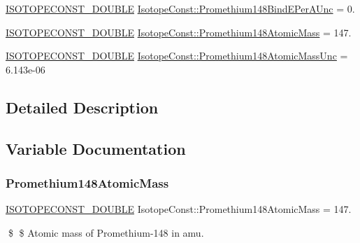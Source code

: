 \begin{DoxyCompactItemize}
\item 
\mbox{\hyperlink{group___isotope_const-_macros_ga8f45a7272ce02c0b4c65c44636ed719a}{I\+S\+O\+T\+O\+P\+E\+C\+O\+N\+S\+T\+\_\+\+D\+O\+U\+B\+LE}} \mbox{\hyperlink{group___isotope_const-_promethium-_pm148_ga531eec8acfa84c8b072fa3b90fe8dd25}{Isotope\+Const\+::\+Promethium148\+Bind\+E\+Per\+A\+Unc}} = 0.
\item 
\mbox{\hyperlink{group___isotope_const-_macros_ga8f45a7272ce02c0b4c65c44636ed719a}{I\+S\+O\+T\+O\+P\+E\+C\+O\+N\+S\+T\+\_\+\+D\+O\+U\+B\+LE}} \mbox{\hyperlink{group___isotope_const-_promethium-_pm148_ga97f350f6a1ffa0208c211b70b80fc8d8}{Isotope\+Const\+::\+Promethium148\+Atomic\+Mass}} = 147.
\item 
\mbox{\hyperlink{group___isotope_const-_macros_ga8f45a7272ce02c0b4c65c44636ed719a}{I\+S\+O\+T\+O\+P\+E\+C\+O\+N\+S\+T\+\_\+\+D\+O\+U\+B\+LE}} \mbox{\hyperlink{group___isotope_const-_promethium-_pm148_ga13024aeef9b754a5008acdd554038635}{Isotope\+Const\+::\+Promethium148\+Atomic\+Mass\+Unc}} = 6.\+143e-\/06
\end{DoxyCompactItemize}


\subsection{Detailed Description}


\subsection{Variable Documentation}
\mbox{\label{group___isotope_const-_promethium-_pm148_ga97f350f6a1ffa0208c211b70b80fc8d8}} 
\subsubsection{\texorpdfstring{Promethium148\+Atomic\+Mass}{Promethium148AtomicMass}}
{\footnotesize\ttfamily \mbox{\hyperlink{group___isotope_const-_macros_ga8f45a7272ce02c0b4c65c44636ed719a}{I\+S\+O\+T\+O\+P\+E\+C\+O\+N\+S\+T\+\_\+\+D\+O\+U\+B\+LE}} Isotope\+Const\+::\+Promethium148\+Atomic\+Mass = 147.}

\$ \$ Atomic mass of Promethium-\/148 in amu. \mbox{\label{group___isotope_const-_promethium-_pm148_ga13024aeef9b754a5008acdd554038635}} 

